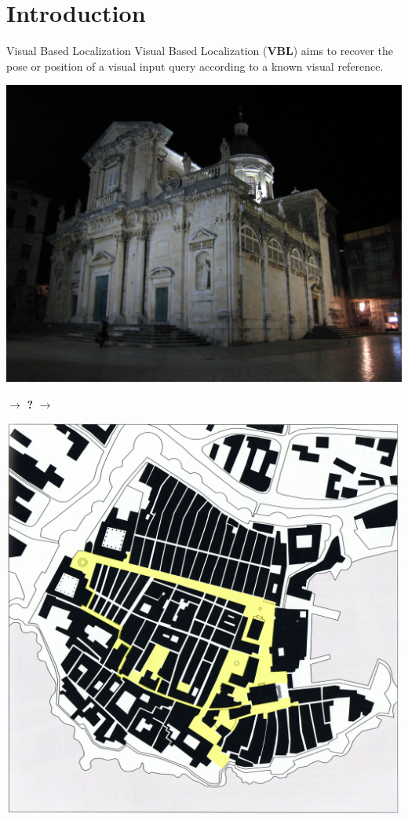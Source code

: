 \section{Introduction}

\label{sec:intro}

\begin{frame}{Visual Based Localization}
	Visual Based Localization (\textbf{VBL}) aims to recover the pose or position of a visual input query according to a known visual reference.
	\vfill	
	\begin{minipage}{0.4\linewidth}
	   \centering
		\includegraphics[width=\linewidth]{images/intro_fig/dubrovnik_night_query.jpg}
	\end{minipage}
	$\rightarrow$ \textbf{?} $\rightarrow$
	\begin{minipage}{0.4\linewidth}
	   \centering
		\includegraphics[width=\linewidth]{images/intro_fig/dubrovnik_map.jpg}
	\end{minipage}	
\end{frame}

